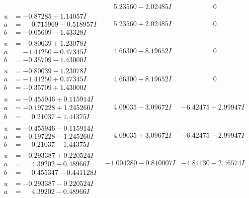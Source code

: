 \documentclass[1p]{elsarticle_modified}
\theoremstyle{definition}
\begin{document}
$$\begin{array}{c|c|c}
 & \phantom{-}5.23560 - 2.02485 I & \phantom{-0.000000 } 0 \\ \hline\begin{aligned}
u &= -0.87285 - 1.14057 I \\
a &= \phantom{-}0.715969 - 0.518957 I \\
b &= -0.05609 - 1.43328 I\end{aligned}
 & \phantom{-}5.23560 + 2.02485 I & \phantom{-0.000000 } 0 \\ \hline\begin{aligned}
u &= -0.80039 + 1.23078 I \\
a &= -1.41250 - 0.47345 I \\
b &= -0.35709 - 1.43000 I\end{aligned}
 & \phantom{-}4.66300 - 8.19652 I & \phantom{-0.000000 } 0 \\ \hline\begin{aligned}
u &= -0.80039 - 1.23078 I \\
a &= -1.41250 + 0.47345 I \\
b &= -0.35709 + 1.43000 I\end{aligned}
 & \phantom{-}4.66300 + 8.19652 I & \phantom{-0.000000 } 0 \\ \hline\begin{aligned}
u &= -0.455946 + 0.115914 I \\
a &= -0.197228 + 1.245260 I \\
b &= \phantom{-}0.21037 + 1.44375 I\end{aligned}
 & \phantom{-}4.09035 - 3.09672 I & -6.42475 + 2.99947 I \\ \hline\begin{aligned}
u &= -0.455946 - 0.115914 I \\
a &= -0.197228 - 1.245260 I \\
b &= \phantom{-}0.21037 - 1.44375 I\end{aligned}
 & \phantom{-}4.09035 + 3.09672 I & -6.42475 - 2.99947 I \\ \hline\begin{aligned}
u &= -0.293387 + 0.220524 I \\
a &= \phantom{-}4.39202 + 0.48966 I \\
b &= \phantom{-}0.455347 - 0.441128 I\end{aligned}
 & -1.004280 - 0.810007 I & -4.84130 - 2.46574 I \\ \hline\begin{aligned}
u &= -0.293387 - 0.220524 I \\
a &= \phantom{-}4.39202 - 0.48966 I \\

\end{aligned}
\end{array}$$
\end{document}
